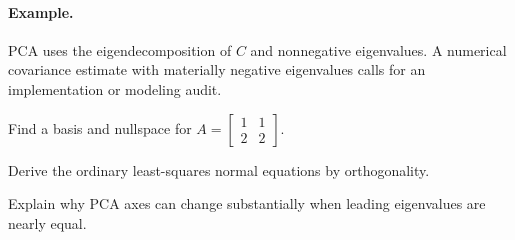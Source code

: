 \paragraph{Example.} PCA uses the eigendecomposition of $C$ and nonnegative eigenvalues. A numerical covariance estimate with materially negative eigenvalues calls for an implementation or modeling audit.

\begin{exercises}
\item Find a basis and nullspace for $A=\begin{bmatrix}1&1\\2&2\end{bmatrix}$.
\item Derive the ordinary least-squares normal equations by orthogonality.
\item Explain why PCA axes can change substantially when leading eigenvalues are nearly equal.
\end{exercises}